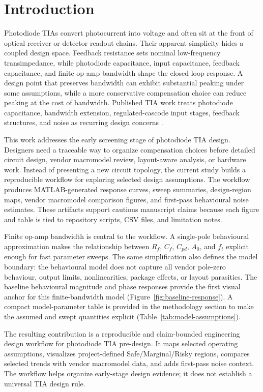 \section{Introduction}

Photodiode TIAs convert photocurrent into voltage and often sit at the front of optical receiver or detector readout chains. Their apparent simplicity hides a coupled design space. Feedback resistance sets nominal low-frequency transimpedance, while photodiode capacitance, input capacitance, feedback capacitance, and finite op-amp bandwidth shape the closed-loop response. A design point that preserves bandwidth can exhibit substantial peaking under some assumptions, while a more conservative compensation choice can reduce peaking at the cost of bandwidth. Published TIA work treats photodiode capacitance, bandwidth extension, regulated-cascode input stages, feedback structures, and noise as recurring design concerns \citep{ANALUI_2004_BW_ENHANCEMENT,LU_2007_BROADBAND_TIA,PARK_YOO_2004_RGC_TIA,NOH_2020_CF_TIA_DC_LOOP}.

This work addresses the early screening stage of photodiode TIA design. Designers need a traceable way to organize compensation choices before detailed circuit design, vendor macromodel review, layout-aware analysis, or hardware work. Instead of presenting a new circuit topology, the current study builds a reproducible workflow for exploring selected design assumptions. The workflow produces MATLAB-generated response curves, sweep summaries, design-region maps, vendor macromodel comparison figures, and first-pass behavioural noise estimates. These artifacts support cautious manuscript claims because each figure and table is tied to repository scripts, CSV files, and limitation notes.

Finite op-amp bandwidth is central to the workflow. A single-pole behavioural approximation makes the relationship between $R_f$, $C_f$, $C_{pd}$, $A_0$, and $f_t$ explicit enough for fast parameter sweeps. The same simplification also defines the model boundary: the behavioural model does not capture all vendor pole-zero behaviour, output limits, nonlinearities, package effects, or layout parasitics. The baseline behavioural magnitude and phase responses provide the first visual anchor for this finite-bandwidth model (Figure~\ref{fig:baseline-response}). A compact model-parameter table is provided in the methodology section to make the assumed and swept quantities explicit (Table~\ref{tab:model-assumptions}).

The resulting contribution is a reproducible and claim-bounded engineering design workflow for photodiode TIA pre-design. It maps selected operating assumptions, visualizes project-defined Safe/Marginal/Risky regions, compares selected trends with vendor macromodel data, and adds first-pass noise context. The workflow helps organize early-stage design evidence; it does not establish a universal TIA design rule.
